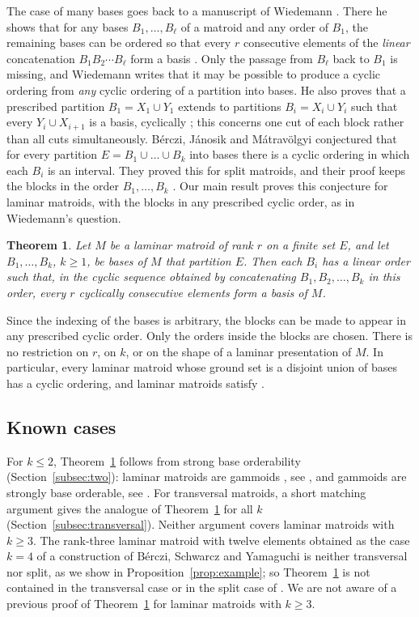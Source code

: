 \documentclass[11pt]{amsart}
\newtheorem{theorem}{Theorem}[section]
\theoremstyle{definition}
\theoremstyle{remark}
\numberwithin{equation}{section}
\begin{document}
The case of many bases goes back to a manuscript of Wiedemann \cite{Wiedemann}. There he shows that for any bases $B_1,\dots,B_\ell$ of a matroid and any order of $B_1$, the remaining bases can be ordered so that every $r$ consecutive elements of the \emph{linear} concatenation $B_1B_2\cdots B_\ell$ form a basis \cite[Section~2]{Wiedemann}. Only the passage from $B_\ell$ back to $B_1$ is missing, and Wiedemann writes that it may be possible to produce a cyclic ordering from \emph{any} cyclic ordering of a partition into bases. He also proves that a prescribed partition $B_1=X_1\cup Y_1$ extends to partitions $B_i=X_i\cup Y_i$ such that every $Y_i\cup X_{i+1}$ is a basis, cyclically \cite[Section~3]{Wiedemann}; this concerns one cut of each block rather than all cuts simultaneously. B\'erczi, J\'anosik and M\'atrav\"olgyi \cite[Conjecture~3]{BJM} conjectured that for every partition $E=B_1\cup\dots\cup B_k$ into bases there is a cyclic ordering in which each $B_i$ is an interval. They proved this for split matroids, and their proof keeps the blocks in the order $B_1,\dots,B_k$ \cite[Theorem~4 and Remark~5]{BJM}. Our main result proves this conjecture for laminar matroids, with the blocks in any prescribed cyclic order, as in Wiedemann's question.

\begin{theorem}\label{thm:main}
Let $M$ be a laminar matroid of rank $r$ on a finite set $E$, and let $B_1,\dots,B_k$, $k\ge 1$, be bases of $M$ that partition $E$. Then each $B_i$ has a linear order such that, in the cyclic sequence obtained by concatenating $B_1,B_2,\dots,B_k$ in this order, every $r$ cyclically consecutive elements form a basis of $M$.
\end{theorem}

Since the indexing of the bases is arbitrary, the blocks can be made to appear in any prescribed cyclic order. Only the orders inside the blocks are chosen. There is no restriction on $r$, on $k$, or on the shape of a laminar presentation of $M$. In particular, every laminar matroid whose ground set is a disjoint union of bases has a cyclic ordering, and laminar matroids satisfy \cite[Conjecture~3]{BJM}.

\subsection*{Known cases}
For $k\le 2$, Theorem~\ref{thm:main} follows from strong base orderability (Section~\ref{subsec:two}): laminar matroids are gammoids \cite{Finkelstein}, see \cite[Section~1]{FO}, and gammoids are strongly base orderable, see \cite[Section~1]{BSY}. For transversal matroids, a short matching argument gives the analogue of Theorem~\ref{thm:main} for all $k$ (Section~\ref{subsec:transversal}). Neither argument covers laminar matroids with $k\ge3$. The rank-three laminar matroid with twelve elements obtained as the case $k=4$ of a construction of B\'erczi, Schwarcz and Yamaguchi \cite[proof of Theorem~1.10]{BSY} is neither transversal nor split, as we show in Proposition~\ref{prop:example}; so Theorem~\ref{thm:main} is not contained in the transversal case or in the split case of \cite{BJM}. We are not aware of a previous proof of Theorem~\ref{thm:main} for laminar matroids with $k\ge 3$.
\end{document}
